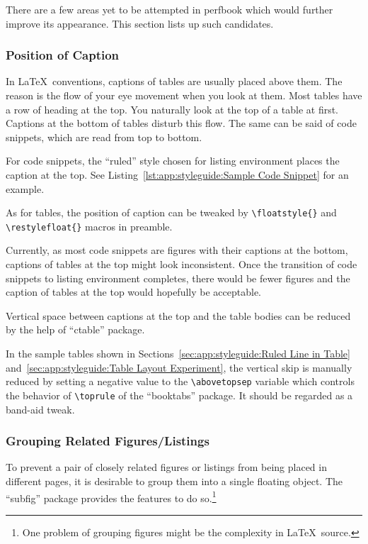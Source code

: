 There are a few areas yet to be attempted in perfbook
which would further improve its appearance.
This section lists up such candidates.

\subsubsection{Position of Caption}
\label{sec:app:styleguide:Position of Caption}

In \LaTeX\ conventions, captions of tables are usually placed
above them. The reason is the flow of your eye movement
when you look at them. Most tables have a row of heading at the
top. You naturally look at the top of a table at first. Captions at
the bottom of tables disturb this flow.
The same can be said of code snippets, which are read from
top to bottom.

For code snippets, the ``ruled'' style chosen for listing
environment places the caption at the top.
See Listing~\ref{lst:app:styleguide:Sample Code Snippet}
for an example.

As for tables, the position of caption can be tweaked by
\verb|\floatstyle{}| and \verb|\restylefloat{}| macros
in preamble.

Currently, as most code snippets are figures with their captions
at the bottom, captions of tables at the top might look inconsistent.
Once the transition of code snippets to listing environment
completes, there would be fewer figures and the caption of tables
at the top would hopefully be acceptable.

Vertical space between captions at the top and the table bodies
can be reduced by the help of ``ctable'' package.

In the sample tables shown in
Sections~\ref{sec:app:styleguide:Ruled Line in Table}
and~\ref{sec:app:styleguide:Table Layout Experiment},
the vertical skip is manually reduced by setting a negative value to the
\verb|\abovetopsep| variable which controls the behavior of
\verb|\toprule| of the ``booktabs'' package.
It should be regarded as a band-aid tweak.

\subsubsection{Grouping Related Figures/Listings}
\label{sec:app:styleguide:Grouping Related Figures/Listings}

To prevent a pair of closely related figures or listings
from being placed in different pages, it is desirable to group
them into a single floating object.
The ``subfig'' package provides the features to do so.\footnote{
  One problem of grouping figures might be the complexity in
  \LaTeX\ source.}

